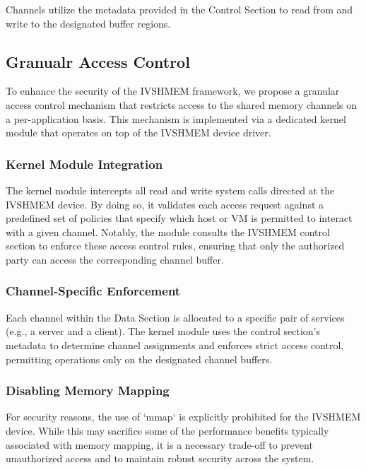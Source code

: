 \documentclass[letterpaper,twocolumn,10pt]{article}
\begin{document}
Channels utilize the metadata provided in the Control Section to read from and write to the designated buffer regions.


\subsection{Granualr Access Control}


To enhance the security of the IVSHMEM framework, we propose a granular access control mechanism that restricts access to the shared memory channels on a per-application basis. This mechanism is implemented via a dedicated kernel module that operates on top of the IVSHMEM device driver.



\subsubsection{Kernel Module Integration}

The kernel module intercepts all read and write system calls directed at the IVSHMEM device. By doing so, it validates each access request against a predefined set of policies that specify which host or VM is permitted to interact with a given channel. Notably, the module consults the IVSHMEM control section to enforce these access control rules, ensuring that only the authorized party can access the corresponding channel buffer.



\subsubsection{Channel-Specific Enforcement}

Each channel within the Data Section is allocated to a specific pair of services (e.g., a server and a client). The kernel module uses the control section's metadata to determine channel assignments and enforces strict access control, permitting operations only on the designated channel buffers.



\subsubsection{Disabling Memory Mapping}

For security reasons, the use of `mmap` is explicitly prohibited for the IVSHMEM device. While this may sacrifice some of the performance benefits typically associated with memory mapping, it is a necessary trade-off to prevent unauthorized access and to maintain robust security across the system.
\end{document}

